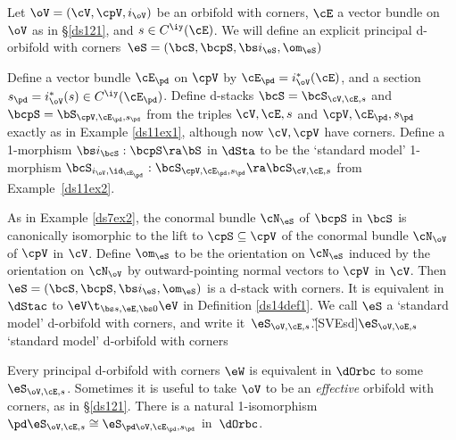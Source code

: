 \documentclass{article}
\begin{document}
\begin{ex} Let $\oV=(\cV,\cpV,i_\oV)$ be an orbifold with
corners, $\cE$ a vector bundle on $\oV$ as in \S\ref{ds121}, and
$s\in C^\iy(\cE)$. We will define an explicit principal d-orbifold
with corners~$\eS=(\bcS,\bcpS,\bs i_\eS,\om_\eS)$

Define a vector bundle $\cE_\pd$ on $\cpV$ by
$\cE_\pd=i_\oV^*(\cE)$, and a section $s_\pd=i_\oV^*(s)\in
C^\iy(\cE_\pd)$. Define d-stacks $\bcS=\bcS_{\cV,\cE,s}$ and
$\bcpS=\bS_{\cpV,\cE_\pd,s_\pd}$ from the triples $\cV,\cE,s$ and
$\cpV,\cE_\pd,s_\pd$ exactly as in Example \ref{ds11ex1}, although
now $\cV,\cpV$ have corners. Define a 1-morphism $\bs
i_\bcS:\bcpS\ra\bS$ in $\dSta$ to be the `standard model' 1-morphism
$\bcS_{i_\oV,\id_{\cE_\pd}}:\bcS_{\cpV,\cE_\pd,s_\pd}\ra\bcS_{\cV,\cE,s}$
from Example~\ref{ds11ex2}.

As in Example \ref{ds7ex2}, the conormal bundle $\cN_\eS$ of $\bcpS$
in $\bcS$ is canonically isomorphic to the lift to
$\cpS\subseteq\cpV$ of the conormal bundle $\cN_\oV$ of $\cpV$ in
$\cV$. Define $\om_\eS$ to be the orientation on $\cN_\eS$ induced
by the orientation on $\cN_\oV$ by outward-pointing normal vectors
to $\cpV$ in $\cV$. Then $\eS=(\bcS,\bcpS,\bs i_\eS,\om_\eS)$ is a
d-stack with corners. It is equivalent in $\dStac$ to $\eV\t_{\bs
s,\eE,\bs 0}\eV$ in Definition \ref{ds14def1}. We call $\eS$ a
`standard model' d-orbifold with corners, and write
it~$\eS_{\oV,\cE,s}$.\G[SVEsd]{$\eS_{\oV,\oE,s}$}{`standard model'
d-orbifold with corners}

Every principal d-orbifold with corners $\eW$ is equivalent in
$\dOrbc$ to some $\eS_{\oV,\cE,s}$. Sometimes it is useful to take
$\oV$ to be an {\it effective\/} orbifold with corners, as in \S\ref{ds121}. There is a natural
1-isomorphism $\pd\eS_{\oV,\cE,s}\cong\eS_{\pd
\oV,\cE_\pd,s_\pd}$ in~$\dOrbc$.
\label{ds14ex1}
\end{ex}
\end{document}
